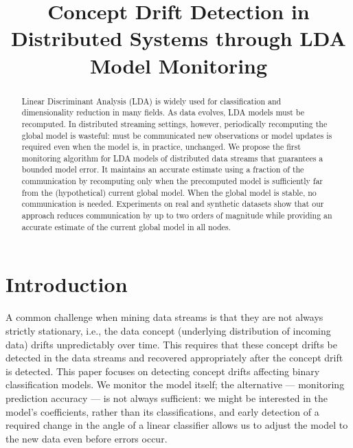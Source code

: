 \documentclass[11pt,twocolumn,varwidth=true,a4paper,fleqn]{article}
\begin{document}
\nocite{*}

\title{Concept Drift Detection in Distributed Systems through LDA
Model Monitoring}
\date{}
\maketitle

\begin{abstract}
Linear Discriminant Analysis (LDA) is widely used for classification and
dimensionality reduction in many fields. As data evolves, LDA models must be recomputed. 
In distributed streaming settings, however, periodically recomputing the global model is
wasteful: must be communicated new observations or model updates is required
even when the model is, in practice, unchanged.
We propose the first monitoring algorithm for LDA
models of distributed data streams that guarantees a bounded model error. 
It maintains an accurate estimate using a fraction of the communication by recomputing only
when the precomputed model is sufficiently far from the
(hypothetical) current global model. When the global model
is stable, no communication is needed.
Experiments on real and synthetic datasets show that
our approach reduces communication by up to two orders
of magnitude while providing an accurate estimate of the
current global model in all nodes.
\end{abstract}

\section{Introduction}
A common challenge when mining data streams is that
they are not always strictly stationary, i.e., the data
concept (underlying distribution of incoming data) drifts 
unpredictably over time. This requires that these concept drifts be detected 
in the data streams and recovered appropriately after the concept drift 
is detected. This paper focuses on detecting concept drifts affecting binary 
classification models.
We monitor the model itself; the alternative --- monitoring prediction
accuracy --- is not always sufficient: we might be interested in the model's
coefficients, rather than its classifications, and early detection of a
required change in the angle of a linear classifier allows us to adjust 
the model to the new data even before errors occur.
\end{document}

